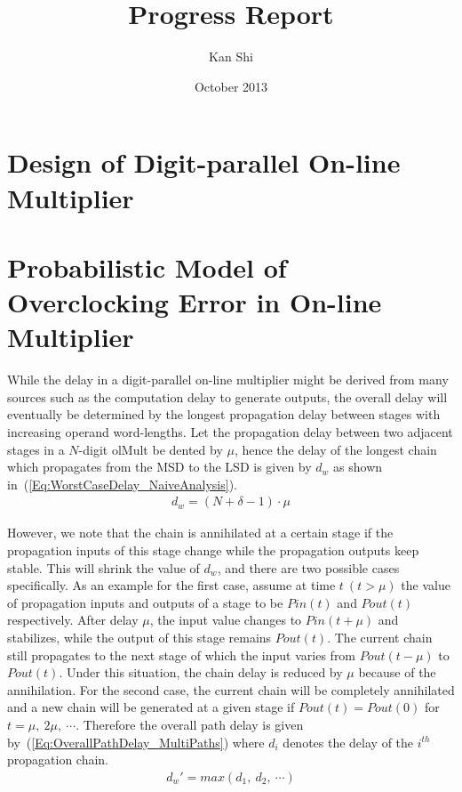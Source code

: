 \documentclass[a4paper, 11pt]{article}
\title{Progress Report}
\author{Kan Shi}
\date{October 2013}
\begin{document}
\maketitle
\vspace{-10mm}

\section{Design of Digit-parallel On-line Multiplier}

\section{Probabilistic Model of Overclocking Error in On-line Multiplier}

While the delay in a digit-parallel on-line multiplier might be derived from many sources such as the computation delay to generate outputs, the overall delay will eventually be determined by the longest propagation delay between stages with increasing operand word-lengths. Let the propagation delay between two adjacent stages in a $N$-digit olMult be dented by $\mu$, hence the delay of the longest chain which propagates from the MSD to the LSD is given by $d_w$ as shown in~(\ref{Eq:WorstCaseDelay_NaiveAnalysis}).
\begin{eqnarray}\label{Eq:WorstCaseDelay_NaiveAnalysis}
  d_w = (N+\delta-1)\cdot \mu
\end{eqnarray}

However, we note that the chain is annihilated at a certain stage if the propagation inputs of this stage change while the propagation outputs keep stable. This will shrink the value of $d_w$, and there are two possible cases specifically. As an example for the first case, assume at time $t~(t>\mu)$ the value of propagation inputs and outputs of a stage to be $Pin(t)$ and $Pout(t)$ respectively. After delay $\mu$, the input value changes to $Pin(t+\mu)$ and stabilizes, while the output of this stage remains $Pout(t)$. The current chain still propagates to the next stage of which the input varies from $Pout(t-\mu)$ to $Pout(t)$. Under this situation, the chain delay is reduced by $\mu$ because of the annihilation. For the second case, the current chain will be completely annihilated and a new chain will be generated at a given stage if $Pout(t)=Pout(0)$ for $t=\mu,~2\mu,~\cdots$. Therefore the overall path delay is given by~(\ref{Eq:OverallPathDelay_MultiPaths}) where $d_i$ denotes the delay of the $i^{th}$ propagation chain.
\begin{eqnarray}\label{Eq:OverallPathDelay_MultiPaths}
  d_w'=max(d_1,~d_2,~\cdots)
\end{eqnarray}
\end{document}

